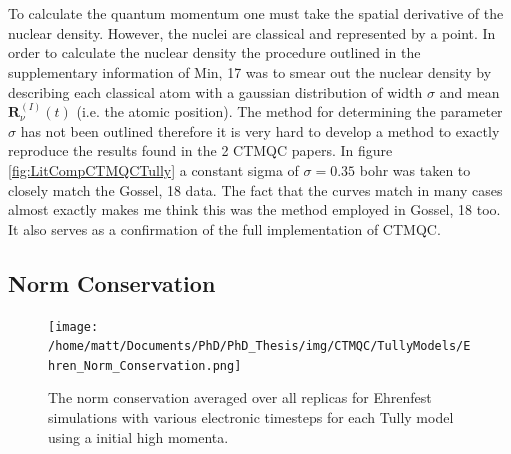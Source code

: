 \\\\
To calculate the quantum momentum one must take the spatial derivative of the nuclear density. However, the nuclei are classical and represented by a point. In order to calculate the nuclear density the procedure outlined in the supplementary information of Min, 17 \cite{min_ab_2017} was to smear out the nuclear density by describing each classical atom with a gaussian distribution of width $\sigma$ and mean $\mathbf{R}^{(I)}_{\nu}(t)$ (i.e. the atomic position). The method for determining the parameter $\sigma$ has not been outlined therefore it is very hard to develop a method to exactly reproduce the results found in the 2 CTMQC papers. In figure \ref{fig:LitCompCTMQCTully} a constant sigma of $\sigma = 0.35$ bohr was taken to closely match the Gossel, 18 data. The fact that the curves match in many cases almost exactly makes me think this was the method employed in Gossel, 18 too. It also serves as a confirmation of the full implementation of CTMQC.


\subsection{Norm Conservation}
\label{sect:normCons}
\begin{figure}[h]
	\texttt{[image: /home/matt/Documents/PhD/PhD\_Thesis/img/CTMQC/TullyModels/Ehren\_Norm\_Conservation.png]}
	\caption{\label{fig:EhrenNormCons}The norm conservation averaged over all replicas for Ehrenfest simulations with various electronic timesteps for each Tully model using a initial high momenta.}
\end{figure}


